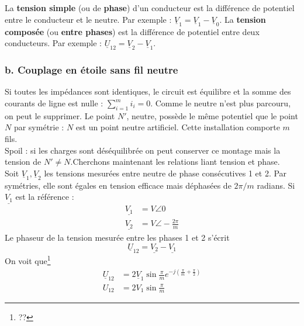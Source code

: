 		La \textbf{tension simple} (ou de \textbf{phase}) d'un conducteur est 
		la différence de potentiel entre le conducteur et le neutre. Par 
		exemple : $\underline{V}_1 = \underline{V}_1-\underline{V}_0$. La 
		\textbf{tension composée} (ou \textbf{entre phases}) est la différence 
		de potentiel entre deux conducteurs. Par exemple : $\underline{U}_{12} = 
		\underline{V}_2-\underline{V}_1$.
		
		
		\subsubsection{b. Couplage en étoile sans fil neutre}
		Si toutes les impédances sont identiques, le circuit est équilibre et 
		la somme des courants de ligne est nulle : $\sum_{i=1}^m i_i=0$. Comme 
		le neutre n'est plus parcouru, on peut le supprimer. Le point $N'$, 
		neutre, possède le même potentiel que le point $N$ par symétrie : $N$ 
		est un point neutre artificiel. Cette installation comporte $m$ fils.\\
		
		Spoil : si les charges sont déséquilibrée on peut conserver ce montage 
		mais la tension de $N' \neq N$.Cherchons maintenant les relations liant 
		tension et phase.\\
		Soit $\underline{V}_1, \underline{V}_2$ les tensions mesurées entre 
		neutre de phase consécutives 1 et 2. Par symétries, elle sont égales 
		en tension efficace mais déphasées de $2\pi/m$ radians. Si $\underline{
		V_1}$ est la référence :
		\begin{equation}
		\begin{array}{ll}
		\underline{V_1} &= V\angle 0\\
		\underline{V_2} &= V\angle -\frac{2\pi}{m}
		\end{array}
		\end{equation}
		Le phaseur de la tension mesurée entre les phases 1 et 2 s'écrit
		\begin{equation}
		\underline{U}_{12} = \underline{V_2}-\underline{V_1}
		\end{equation}
		On voit que\footnote{??} 
		\begin{equation}
		\begin{array}{ll}
		\underline{U}_{12} &= 2\underline{V}_1\sin \frac{\pi}{m}e^{-j\left(
		\frac{\pi}{m}+\frac{\pi}{2}\right)}\\
		U_{12} &= 2V_1\sin\frac{\pi}{m}
		\end{array}
		\end{equation}
		
